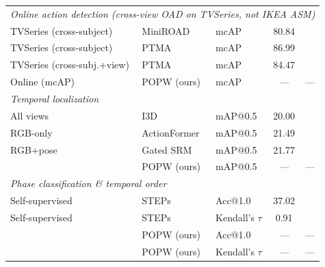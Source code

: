 \documentclass[11pt,a4paper]{article}
\newcommand{\popw}{POPW}
\newcommand{\map}{mAP}
\newcommand{\todo}{\textit{---}}
\newcommand{\popwres}{\todo}
\begin{document}
\begin{table}[!htbp]
\begin{tabular}{l l l c c}
\midrule
\multicolumn{5}{l}{\textit{Online action detection (cross-view OAD on TVSeries, not IKEA ASM)}} \\
TVSeries (cross-subject)       & MiniROAD~\cite{an2023miniroad}     & mcAP    & 80.84 & \cite{an2023miniroad} \\
TVSeries (cross-subject)       & PTMA~\cite{xie2025ptma}         & mcAP    & 86.99 & \cite{xie2025ptma} \\
TVSeries (cross-subj.+view)   & PTMA~\cite{xie2025ptma}         & mcAP    & 84.47 & \cite{xie2025ptma} \\
Online (mcAP)                  & \popw{} (ours)                  & mcAP    & \popwres & --- \\
\midrule
\multicolumn{5}{l}{\textit{Temporal localization}} \\
All views & I3D                       & \map{}@0.5 & 20.00 & \cite{benshabat2021ikea} \\
RGB-only  & ActionFormer~\cite{zhang2022actionformer}              & \map{}@0.5 & 21.49 & \cite{gatedsrm2026} \\
RGB+pose  & Gated SRM                 & \map{}@0.5 & 21.77 & \cite{gatedsrm2026} \\
           & \popw{} (ours)            & \map{}@0.5 & \popwres & --- \\
\midrule
\multicolumn{5}{l}{\textit{Phase classification \& temporal order}} \\
Self-supervised & STEPs~\cite{shah2023steps}               & Acc@1.0          & 37.02 & \cite{shah2023steps} \\
Self-supervised & STEPs               & Kendall's $\tau$ &  0.91 & \cite{shah2023steps} \\
                & \popw{} (ours)      & Acc@1.0          & \popwres & --- \\
                & \popw{} (ours)      & Kendall's $\tau$ & \popwres & --- \\
\bottomrule
\end{tabular}
\end{table}
\end{document}
